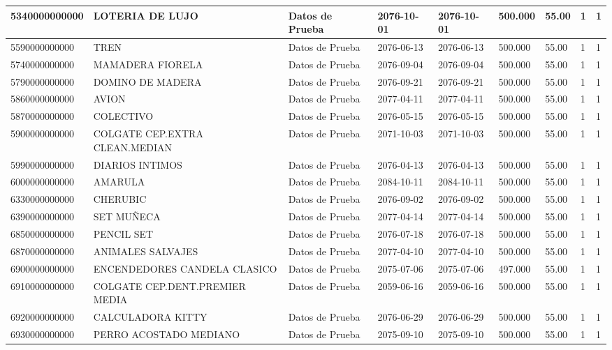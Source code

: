\documentclass[a4paper,12pt]{article}
\begin{document}
\begin{landscape}
\begin{longtable}{|p{4cm}|p{2.5cm}|p{2.5cm}|p{1.8cm}|p{1.8cm}|p{1cm}|p{1cm}|p{3cm}|p{3cm}||}
5340000000000 & LOTERIA DE LUJO & Datos de Prueba & 2076-10-01 & 2076-10-01 & 500.000 & 55.00 & 1 & 1 \\ \hline 
5590000000000 & TREN & Datos de Prueba & 2076-06-13 & 2076-06-13 & 500.000 & 55.00 & 1 & 1 \\ \hline 
5740000000000 & MAMADERA FIORELA & Datos de Prueba & 2076-09-04 & 2076-09-04 & 500.000 & 55.00 & 1 & 1 \\ \hline 
5790000000000 & DOMINO DE MADERA & Datos de Prueba & 2076-09-21 & 2076-09-21 & 500.000 & 55.00 & 1 & 1 \\ \hline 
5860000000000 & AVION & Datos de Prueba & 2077-04-11 & 2077-04-11 & 500.000 & 55.00 & 1 & 1 \\ \hline 
5870000000000 & COLECTIVO & Datos de Prueba & 2076-05-15 & 2076-05-15 & 500.000 & 55.00 & 1 & 1 \\ \hline 
5900000000000 & COLGATE CEP.EXTRA CLEAN.MEDIAN & Datos de Prueba & 2071-10-03 & 2071-10-03 & 500.000 & 55.00 & 1 & 1 \\ \hline 
5990000000000 & DIARIOS INTIMOS & Datos de Prueba & 2076-04-13 & 2076-04-13 & 500.000 & 55.00 & 1 & 1 \\ \hline 
6000000000000 & AMARULA & Datos de Prueba & 2084-10-11 & 2084-10-11 & 500.000 & 55.00 & 1 & 1 \\ \hline 
6330000000000 & CHERUBIC & Datos de Prueba & 2076-09-02 & 2076-09-02 & 500.000 & 55.00 & 1 & 1 \\ \hline 
6390000000000 & SET MUÑECA & Datos de Prueba & 2077-04-14 & 2077-04-14 & 500.000 & 55.00 & 1 & 1 \\ \hline 
6850000000000 & PENCIL SET & Datos de Prueba & 2076-07-18 & 2076-07-18 & 500.000 & 55.00 & 1 & 1 \\ \hline 
6870000000000 & ANIMALES SALVAJES & Datos de Prueba & 2077-04-10 & 2077-04-10 & 500.000 & 55.00 & 1 & 1 \\ \hline 
6900000000000 & ENCENDEDORES CANDELA CLASICO & Datos de Prueba & 2075-07-06 & 2075-07-06 & 497.000 & 55.00 & 1 & 1 \\ \hline 
6910000000000 & COLGATE CEP.DENT.PREMIER MEDIA & Datos de Prueba & 2059-06-16 & 2059-06-16 & 500.000 & 55.00 & 1 & 1 \\ \hline 
6920000000000 & CALCULADORA KITTY & Datos de Prueba & 2076-06-29 & 2076-06-29 & 500.000 & 55.00 & 1 & 1 \\ \hline 
6930000000000 & PERRO ACOSTADO MEDIANO & Datos de Prueba & 2075-09-10 & 2075-09-10 & 500.000 & 55.00 & 1 & 1 \\ \hline 

\end{longtable}
\end{landscape}
\end{document}
